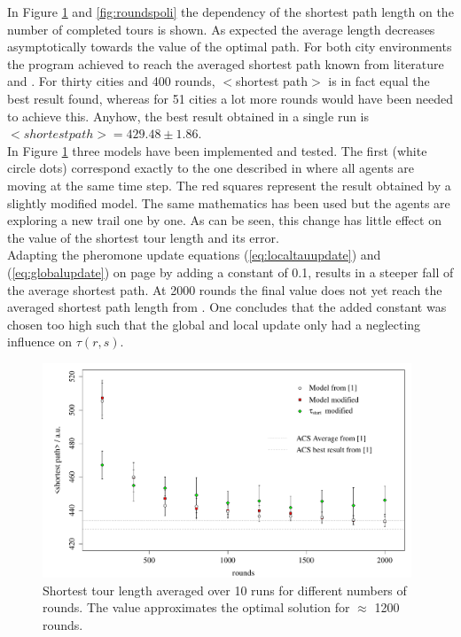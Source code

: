 In Figure \ref{fig:roundspeil} and \ref{fig:roundspoli} the dependency of the shortest path length on the number of completed tours is shown. As expected the average length decreases asymptotically towards the value of the optimal path. For both city environments the program achieved to reach the averaged shortest path known from literature \cite{paper} and \cite{oli}. For thirty cities and 400 rounds, $<$shortest path$>$ is in fact equal the best result found, whereas for 51 cities a lot more rounds would have been needed to achieve this. Anyhow, the best result obtained in a single run is $<shortest path>=429.48 \pm 1.86$.\\In Figure \ref{fig:roundspeil} three models have been implemented and tested. The first (white circle dots) correspond exactly to the one described in \cite{paper} where all agents are moving at the same time step. The red squares represent the result obtained by a slightly modified model. The same mathematics has been used but the agents are exploring a new trail one by one. As can be seen, this change has little effect on the value of the shortest tour length and its error.\\ Adapting the pheromone update equations (\ref{eq:localtauupdate}) and (\ref{eq:globalupdate}) on page \pageref{sec:model} by adding a constant of 0.1, results in a steeper fall of the average shortest path. At 2000 rounds the final value does not yet reach the averaged shortest path length from \cite{paper}. One concludes that the added constant was chosen too high such that the global and local update only had a neglecting influence on $\tau(r,s)$.\\




\begin{figure}[h!]
\begin{center}
\includegraphics[width=11cm, height= 6 cm]{rounds_vs_shortestpath_eil}
\caption{Shortest tour length averaged over 10 runs for different numbers of rounds. The value approximates the optimal solution for $\approx$ 1200 rounds.}
\label{fig:roundspeil}
\end{center}
\end{figure}


